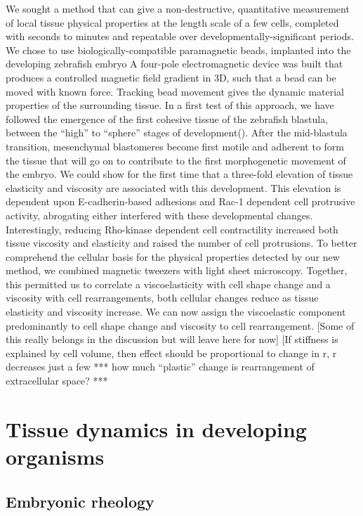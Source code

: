 We sought a method that can give a non-destructive, quantitative measurement of local tissue physical properties at the length scale of a few cells, completed with seconds to minutes and repeatable over developmentally-significant periods.
We chose to use biologically-compatible paramagnetic beads, implanted into the developing zebrafish embryo
A four-pole electromagnetic device was built that produces a controlled magnetic field gradient in 3D, such that a bead can be moved with known force.
Tracking bead movement gives the dynamic material properties of the surrounding tissue. In a first test of this approach, we have followed the emergence of the first cohesive tissue of the zebrafish blastula, between the “high” to “sphere” stages of development(). After the mid-blastula transition, mesenchymal blastomeres become first motile and adherent to form the tissue that will go on to contribute to the first morphogenetic movement of the embryo.
We could show for the first time that a three-fold elevation of tissue elasticity and viscosity  are associated with this development.
This elevation is dependent upon E-cadherin-based adhesions and Rac-1 dependent cell protrusive activity, abrogating either interfered with these developmental changes. Interestingly, reducing Rho-kinase dependent cell contractility increased both tissue viscosity and elasticity  and raised the number of cell protrusions.
To better comprehend the cellular basis for the physical properties detected by our new method, we combined magnetic tweezers with light sheet microscopy.
Together, this permitted us to correlate a viscoelasticity with cell shape change and a viscosity with cell rearrangements, both cellular changes reduce as tissue elasticity and viscosity increase.
We can now assign the viscoelastic component predominantly to cell shape change and viscosity to cell rearrangement.
[Some of this really belongs in the discussion but will leave here for now]
[If stiffness is explained by cell volume, then effect should be proportional to change in r, r decreases just a few %
*** how much “plastic” change is rearrangement of extracellular space? ***


\section{Tissue dynamics in developing organisms}
\subsection{Embryonic rheology}
